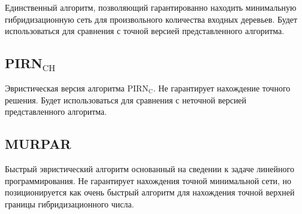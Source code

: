 Единственный алгоритм, позволяющий гарантированно находить минимальную гибридизационную сеть для произвольного количества входных деревьев.
Будет использоваться для сравнения с точной версией представленного алгоритма.

\subsection{PIRN$_\mathrm{CH}$}

Эвристическая версия алгоритма PIRN$_\mathrm{C}$.
Не гарантирует нахождение точного решения.
Будет использоваться для сравнения с неточной версией представленного алгоритма.

\subsection{MURPAR}

Быстрый эвристический алгоритм основанный на сведении к задаче линейного программирования.
Не гарантирует нахождения точной минимальной сети, но позиционируется как очень быстрый алгоритм для нахождения точной верхней границы гибридизационного числа.
